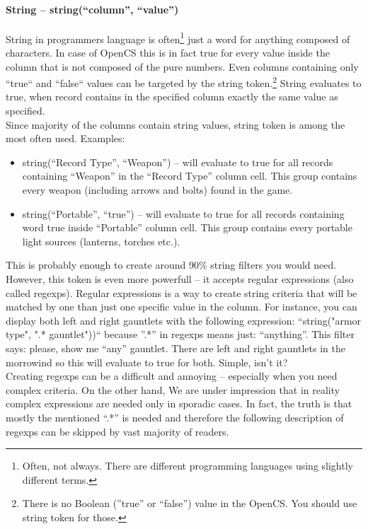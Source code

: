 \paragraph{String -- string(``column'', ``value'')}
String in programmers language is often\footnote{Often, not always. There are different programming languages using slightly different terms.} just a word for anything composed of characters. In case of OpenCS this is in fact true for every value inside the column that is not composed of the pure numbers. Even columns containing only ``true`` and ``false`` values can be targeted by the string token.\footnote{There is no Boolean (''true'' or ``false'') value in the OpenCS. You should use string token for those.} String evaluates to true, when record contains in the specified column exactly the same value as specified.
\\
Since majority of the columns contain string values, string token is among the most often used. Examples:
\begin{itemize}
 \item string(``Record Type'', ``Weapon'') -- will evaluate to true for all records containing ``Weapon'' in the ``Record Type'' column cell. This group contains every weapon (including arrows and bolts) found in the game.
 \item string(``Portable'', ``true'') -- will evaluate to true for all records containing word true inside ``Portable'' column cell. This group contains every portable light sources (lanterns, torches etc.).
\end{itemize}
This is probably enough to create around 90\% string filters you would need. However, this token is even more powerfull -- it accepts regular expressions (also called regexps). Regular expressions is a way to create string criteria that will be matched by one than just one specific value in the column. For instance, you can display both left and right gauntlets with the following expression: ``string("armor type", ".* gauntlet"))`` because ''.*'' in regexps means just: ``anything''. This filter says: please, show me ``any'' gauntlet. There are left and right gauntlets in the morrowind so this will evaluate to true for both. Simple, isn't it?
\\
Creating regexps can be a difficult and annoying -- especially when you need complex criteria. On the other hand, We are under impression that in reality complex expressions are needed only in sporadic cases. In fact, the truth is that mostly the mentioned ``.*'' is needed and therefore the following description of regexps can be skipped by vast majority of readers.

